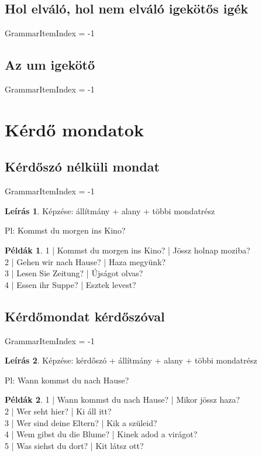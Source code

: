 \documentclass{article}
\theoremstyle{definition}
\newtheorem*{exmp}{Példák}
\newtheorem*{desc}{Leírás}
\begin{document}
\subsection{Hol elváló, hol nem elváló igekötős igék}

GrammarItemIndex = -1

\subsection{Az um igekötő}

GrammarItemIndex = -1

\section{Kérdő mondatok}

\subsection{Kérdőszó nélküli mondat}

GrammarItemIndex = -1

\begin{desc}
Képzése: állítmány + alany + többi mondatrész

Pl: Kommst du morgen ins Kino?
\end{desc}

\begin{exmp}
1 | Kommst du morgen ins Kino? | Jössz holnap moziba?\\
2 | Gehen wir nach Hause? | Haza megyünk?\\
3 | Lesen Sie Zeitung? | Újságot olvas?\\
4 | Essen ihr Suppe? | Esztek levest?\\
\end{exmp}

\subsection{Kérdőmondat kérdőszóval}

GrammarItemIndex = -1

\begin{desc}
Képzése: kérdőszó + állítmány + alany + többi mondatrész

Pl: Wann kommst du nach Hause?
\end{desc}

\begin{exmp}
1 | Wann kommst du nach Hause? | Mikor jössz haza?\\
2 | Wer seht hier? | Ki áll itt?\\
3 | Wer sind deine Eltern? | Kik a szüleid?\\
4 | Wem gibst du die Blume? | Kinek adod a virágot?\\
5 | Was siehst du dort? | Kit látsz ott?\\
\end{exmp}
\end{document}
